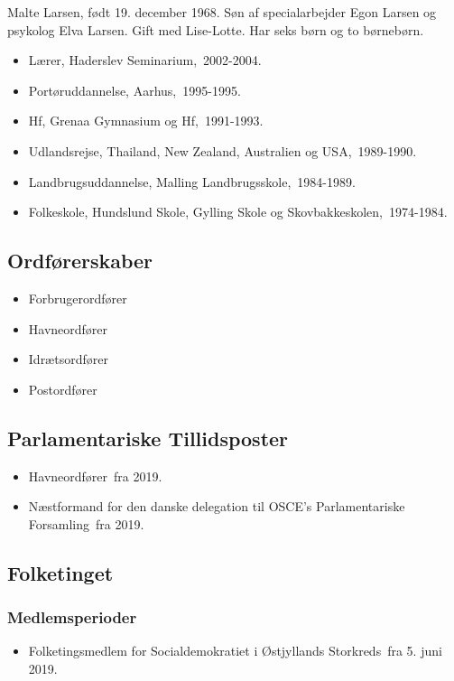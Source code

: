 \documentclass[11pt, a4paper]{awesome-cv}
\begin{document}
\makecvheader[R]
\makelettertitle
\begin{cvletter}
Malte Larsen, født 19. december 1968. Søn af specialarbejder Egon Larsen og psykolog Elva Larsen. Gift med Lise-Lotte. Har seks børn og to børnebørn.

\begin{itemize}
\item Lærer, Haderslev Seminarium, 2002-2004.
\item Portøruddannelse, Aarhus, 1995-1995.
\item Hf, Grenaa Gymnasium og Hf, 1991-1993.
\item Udlandsrejse, Thailand, New Zealand, Australien og USA, 1989-1990.
\item Landbrugsuddannelse, Malling Landbrugsskole, 1984-1989.
\item Folkeskole, Hundslund Skole, Gylling Skole og Skovbakkeskolen, 1974-1984.
\end{itemize}
\subsection*{Ordførerskaber}
\begin{itemize}
\item Forbrugerordfører
\item Havneordfører
\item Idrætsordfører
\item Postordfører
\end{itemize}
\subsection*{Parlamentariske Tillidsposter}
\begin{itemize}
\item Havneordfører fra 2019.
\item Næstformand for den danske delegation til OSCE's Parlamentariske Forsamling fra 2019.
\end{itemize}
\subsection*{Folketinget}
\subsubsection*{Medlemsperioder}
\begin{itemize}
\item Folketingsmedlem for Socialdemokratiet i Østjyllands Storkreds fra 5. juni 2019.
\end{itemize}

\end{cvletter}
\end{document}

